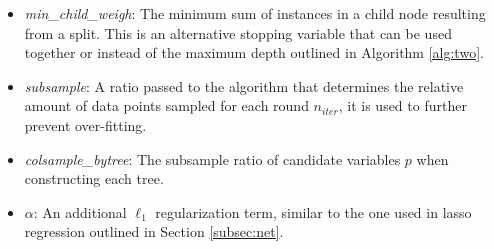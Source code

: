\documentclass[a4paper,12pt, headsepline]{scrartcl}
\numberwithin{equation}{section}
\begin{document}
\begin{itemize}
	\item \textit{min\_child\_weigh}: The minimum sum of instances in a child node resulting from a split. This is an alternative stopping variable that can be used together or instead of the maximum depth outlined in Algorithm \ref{alg:two}.
	\item \textit{subsample}: A ratio passed to the algorithm that determines the relative amount of data points sampled for each round $n_{iter}$, it is used to further prevent over-fitting.
	\item \textit{colsample\_bytree}: The subsample ratio of candidate variables $p$ when constructing each tree.
	\item $\alpha$: An additional $\ell_1$ regularization term, similar to the one used in lasso regression outlined in Section \ref{subsec:net}.
\end{itemize}
\end{document}
